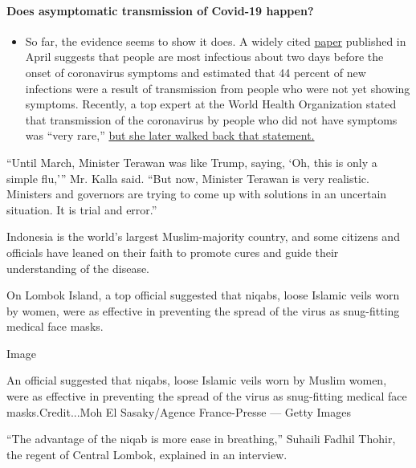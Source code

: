 \begin{itemize}
{  \paragraph{Does asymptomatic transmission of Covid-19
  happen?}\label{does-asymptomatic-transmission-of-covid-19-happen}}

  \begin{itemize}
  \tightlist
  \item
    So far, the evidence seems to show it does. A widely cited
    \href{https://www.nature.com/articles/s41591-020-0869-5}{paper}
    published in April suggests that people are most infectious about
    two days before the onset of coronavirus symptoms and estimated that
    44 percent of new infections were a result of transmission from
    people who were not yet showing symptoms. Recently, a top expert at
    the World Health Organization stated that transmission of the
    coronavirus by people who did not have symptoms was ``very rare,''
    \href{https://www.nytimes.com/2020/06/09/world/coronavirus-updates.html?action=click\&pgtype=Article\&state=default\&region=MAIN_CONTENT_3\&context=storylines_faq\#link-1f302e21}{but
    she later walked back that statement.}
  \end{itemize}
\end{itemize}

``Until March, Minister Terawan was like Trump, saying, `Oh, this is
only a simple flu,''' Mr. Kalla said. ``But now, Minister Terawan is
very realistic. Ministers and governors are trying to come up with
solutions in an uncertain situation. It is trial and error.''

Indonesia is the world's largest Muslim-majority country, and some
citizens and officials have leaned on their faith to promote cures and
guide their understanding of the disease.

On Lombok Island, a top official suggested that niqabs, loose Islamic
veils worn by women, were as effective in preventing the spread of the
virus as snug-fitting medical face masks.

Image

An official suggested that niqabs, loose Islamic veils worn by Muslim
women, were as effective in preventing the spread of the virus as
snug-fitting medical face masks.Credit...Moh El Sasaky/Agence
France-Presse --- Getty Images

``The advantage of the niqab is more ease in breathing,'' Suhaili Fadhil
Thohir, the regent of Central Lombok, explained in an interview.

